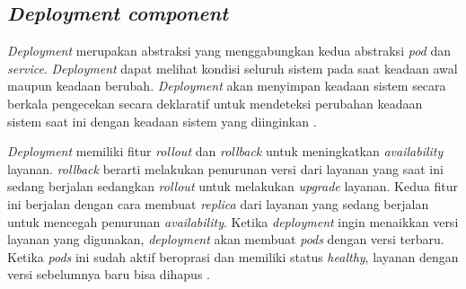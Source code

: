 \subsection{\textit{Deployment component}}

\textit{Deployment} merupakan abstraksi yang menggabungkan kedua abstraksi \textit{pod} dan \textit{service}. \textit{Deployment} dapat melihat kondisi seluruh sistem pada saat keadaan awal maupun keadaan berubah. \textit{Deployment} akan menyimpan keadaan sistem secara berkala pengecekan secara deklaratif untuk mendeteksi perubahan keadaan sistem saat ini dengan keadaan sistem yang diinginkan \parencite{deployment}.

\textit{Deployment} memiliki fitur \textit{rollout} dan \textit{rollback} untuk meningkatkan \textit{availability} layanan. \textit{rollback} berarti melakukan penurunan versi dari layanan yang saat ini sedang berjalan sedangkan \textit{rollout} untuk melakukan \textit{upgrade} layanan. Kedua fitur ini berjalan dengan cara membuat \textit{replica} dari layanan yang sedang berjalan untuk mencegah penurunan \textit{availability}. Ketika \textit{deployment} ingin menaikkan versi layanan yang digunakan, \textit{deployment} akan membuat \textit{pods} dengan versi terbaru. Ketika \textit{pods} ini sudah aktif beroprasi dan memiliki status \textit{healthy}, layanan dengan versi sebelumnya baru bisa dihapus \parencite{deployment}.